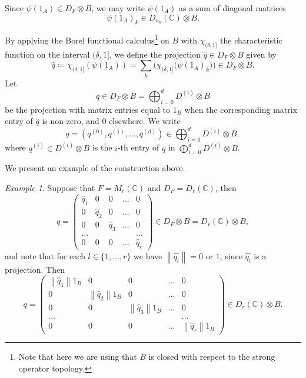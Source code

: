 \documentclass[a4paper]{amsart}
\newcommand{\myhyp}{\textnormal{-}\hskip0pt\relax}
\numberwithin{equation}{section}
\newcommand{\C}{\mathbb{C}}
\newcommand{\prn}[1]{{(#1)}}
\newcommand{\norm}[1]{{\left\lVert #1 \right \rVert}}
\theoremstyle{plain}
\theoremstyle{indented}
\numberwithin{equation}{section}
\theoremstyle{definition}
\theoremstyle{remark}
\newtheorem{example}[thm]{Example}
\theoremstyle{plain}
\theoremstyle{definition}
\begin{document}
Since $\psi(1_A) \in D_F \otimes B $, we may write 
$\psi(1_A)$ as a sum of diagonal matrices 
\[\psi(1_A)_{k} \in D_{n_k}\prn{\C} \otimes B.\] 
   
By applying the Borel functional calculus\footnote{Note that here we are using that $B$ is closed with respect to the strong operator topology.} on $B$
with $\chi_{(\delta,1]} $ 
the characteristic function on the interval $(\delta,1]$, 
we define the projection $\widehat{q} \in D_F \otimes B$ given by
\begin{equation*}
        \widehat{q}  \coloneq \chi_{(\delta,1]} (\psi(1_A) ) = \sum_k \Big(\chi_{(\delta,1]} \big( \psi(1_A)_{k} \big)\Big)
        \in  D_F \otimes B.
\end{equation*}
Let 
\[q \in  D_F \otimes B =\bigoplus_{i=0}^d D^{\prn{i}} \otimes B \] 
be the projection with
matrix entries equal to $1_B$ when the corresponding matrix entry of $\widehat{q}$ is non-zero, and $0$ elsewhere. 
We write 
\[q = (q^{\prn{0}}, q^{\prn{1}}, \hdots, q^{\prn{d}})\in  \bigoplus_{i=0}^d D^{\prn{i}} \otimes B,\] 
where ${q^{\prn{i}}\in {D^{\prn{i}} \otimes B}}$ is the $i$\myhyp{}th entry of 
${q}$ in ${\bigoplus_{i=0}^d D^{\prn{i}} \otimes B}$.

\smallskip
    
We present an example of the construction above.
\begin{example}
         Suppose that $F = M_r( \mathbb{C})$ and $D_F=D_r(\mathbb{C})$, then 
    \[ \widehat{q} = \begin{pmatrix}
        \widehat{q}_1 & 0 & 0 & \hdots &0 \\
        0 & \widehat{q}_2 & 0 & \hdots &0 \\
        0 & 0 & \widehat{q}_3 & \hdots &0 \\
        \hdots &  &  &  &\hdots \\
        0 & 0 & 0 & \hdots &\widehat{q}_r 
    \end{pmatrix} \in D_F \otimes B  = D_r(\mathbb{C}) \otimes B,\]
        and note that for each ${l\in \{1,\hdots,r\}}$ 
        we have ${\norm{\widehat{q_l}} = 0}$ or $1$,  since ${\widehat{q_l}}$ is a projection.
    Then
    \[ q =  \begin{pmatrix}
        \norm{\widehat{q}_1} 1_B & 0 & 0 & \hdots &0 \\
        0 & \norm{\widehat{q}_2} 1_B & 0 & \hdots &0 \\
        0 & 0 & \norm{\widehat{q}_3}1_B & \hdots &0 \\
        \hdots &  &  &  &\hdots \\
        0 & 0 & 0 & \hdots & \norm{\widehat{q}_r } 1_B
    \end{pmatrix} \in D_r(\mathbb{C}) \otimes B.\]
\end{example}
\end{document}
